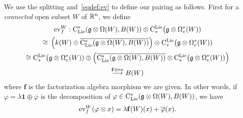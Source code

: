 \documentclass[11pt]{amsart}
\numberwithin{equation}{section}
\begin{document}
 
\smallskip 

We use the splitting and~\eqref{eqdef:ev} to define our pairing as follows. First for a \emph{connected} open subset $W$ of $\mathbb R^n$, we define 
\begin{multline}\label{eq:defevforconnected}
 {\rm ev}_f^W:   {\rm C}_{\rm Lie}^* (\mathfrak g\otimes \Omega (W), B(W)) \otimes {\rm C}^{\rm Lie}_*\big(\mathfrak g \otimes \Omega_c^* (W)) 
 \\ \cong \, \left( k(W) \oplus \overline{{\rm C}_{\rm Lie}^* (\mathfrak g\otimes \Omega (W), B(W))  }\right) 
 \otimes {\rm C}^{\rm Lie}_*\big(\mathfrak g \otimes \Omega_c^* (W))  \\ \cong
 {\rm C}^{\rm Lie}_*\big(\mathfrak g \otimes \Omega_c^* (W))  \oplus  \left(\overline{{\rm C}_{\rm Lie}^* (\mathfrak g\otimes \Omega (W), B(W))  }\otimes {\rm C}^{\rm Lie}_*\big(\mathfrak g \otimes \Omega_c^* (W)) 
 \right) \\
 \stackrel{ \mathbf{f}\oplus {\rm ev}}\longrightarrow  
 B(W)
\end{multline}
where $\mathbf{f}$ is the factorization algebra morphism  we are given.
In other words, if $\varphi = \lambda \mathbf{1} \oplus \overline{\varphi}$ is the decomposition of $\varphi \in  {\rm C}_{\rm Lie}^* (\mathfrak g\otimes \Omega (W), B(W)) $,
we have 
\[ {\rm ev}_f^W(\varphi\otimes x)= \lambda \mathbf{f}(W)(x) + \overline{\varphi}(x). \]


\smallskip
\end{document}
